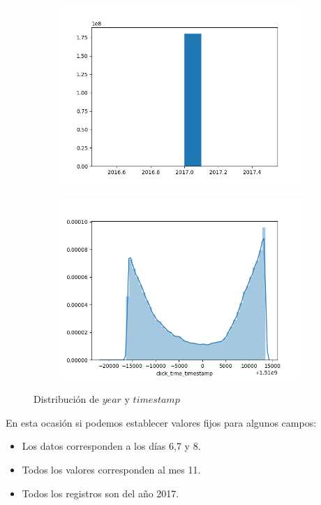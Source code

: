 \begin{figure}[H]
	\centering
	\begin{subfigure}{.5\textwidth}
		\centering
\includegraphics[scale=0.5]{img/click_time_year_distribution.png}
	\end{subfigure}%
	\begin{subfigure}{.5\textwidth}
		\centering
\includegraphics[scale=0.5]{img/normalDistclick_time_timestamp.png}
		
	\end{subfigure}
	\caption{Distribución de $year$ y $timestamp$}

\end{figure}

En esta ocasión si podemos establecer valores fijos para algunos campos:
\begin{itemize}
	\item Los datos corresponden a los días 6,7 y 8.
	\item Todos los valores corresponden al mes 11.
	\item Todos los registros son del año 2017.
\end{itemize}

